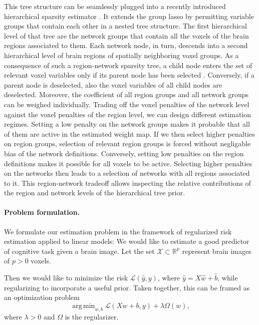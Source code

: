 \documentclass{article}
\DeclareMathOperator*{\argmin}{arg\,min}
\newcommand{\R}{\mathbb{R}}
\begin{document}
This tree structure can be seamlessly plugged into
a recently introduced hierarchical sparsity estimator
\cite{jenatton2011multi}.
It extends the group lasso
\cite{yuan2006model}
by permitting variable groups that contain each other
in a nested tree structure.
The first hierarchical level of that tree are
the network groups that contain all
the voxels of the brain regions associated to them.
Each network node, in turn, descends into a second hierarchical level of
brain regions of spatially neighboring voxel groups.
%
As a consequence of such a region-network sparsity tree,
a child node enters the set of relevant voxel variables only
if its parent node has been selected
\cite{bach2012optimization}.
Conversely,
if a parent node is deselected,
also the voxel variables of all child nodes are deselected.
%
Moreover,
the coefficient of all region groups and all network groups can
be weighed individually.
Trading off the voxel penalties of the network level against the
voxel penalties of the region level,
we can design different estimation regimes.
%
Setting a low penalty on the network groups makes it probable
that all of them are active in the estimated weight map. If we then select
higher penalties on region groups, selection of relevant region groups is
forced without negligable bias of the network definitions.
Conversely, setting low penalties on the region definitions
makes it possible for
all voxels to be active. Selecting higher penalties on the networks then
leads to a selection of networks with all regions associated to it.
%
This region-network tradeoff allows inspecting the relative contributions
of the region and network levels
of the hierarchical tree prior.


\paragraph{Problem formulation.}
We formulate our estimation problem in the framework of regularized risk
estimation applied to linear models: 
We would like to estimate a good predictor of cognitive task
given a brain image. Let the set \(\mathcal X\subset\R^p\) represent brain
images of \(p > 0\) voxels.

Then we would like to minimize the risk \(\mathcal L(\hat y, y)\), where
\(\hat y = X\hat w + \hat b\), while regularizing to incorporate a useful
prior. Taken together, this can be framed as an optimization problem
\[\argmin_{w, b} \mathcal L(Xw + b, y) + \lambda\Omega(w),\]
where \(\lambda > 0\) and \(\Omega\) is the regularizer.
\end{document}
